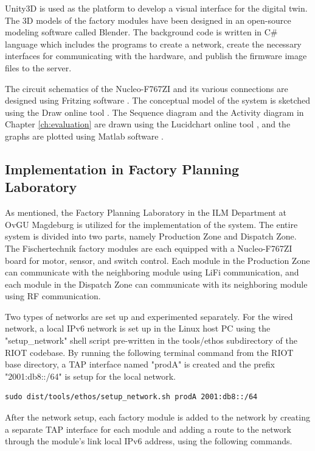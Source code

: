 Unity3D is used as the platform to develop a visual interface for the digital twin. The 3D models of the factory modules have been designed in an open-source modeling software called Blender. The background code is written in C\# language which includes the programs to create a network, create the necessary interfaces for communicating with the hardware, and publish the firmware image files to the server.

The circuit schematics of the Nucleo-F767ZI and its various connections are designed using Fritzing software \cite{Fritzing_2016}. The conceptual model of the system is sketched using the Draw online tool \cite{Benson_2015}. The Sequence diagram and the Activity diagram in Chapter \ref{ch:evaluation} are drawn using the Lucidchart online tool \cite{Dilts_Sun_2010}, and the graphs are plotted using Matlab software \cite{Little_Moler_1984}.

\subsection{Implementation in Factory Planning Laboratory}
As mentioned, the Factory Planning Laboratory in the \acrshort{ILM} Department at OvGU Magdeburg is utilized for the implementation of the system. The entire system is divided into two parts, namely Production Zone and Dispatch Zone. The Fischertechnik factory modules are each equipped with a Nucleo-F767ZI board for motor, sensor, and switch control. Each module in the Production Zone can communicate with the neighboring module using \acrshort{LiFi} communication, and each module in the Dispatch Zone can communicate with its neighboring module using RF communication.

Two types of networks are set up and experimented separately. For the wired network, a local IPv6 network is set up in the Linux host PC using the "setup\_network" shell script pre-written in the tools/ethos subdirectory of the RIOT codebase. 
By running the following terminal command from the RIOT base directory, a TAP interface named "prodA" is created and the prefix "2001:db8::/64" is setup for the local network.

\begin{lstlisting}[caption=Linux Command for Wired Network Setup]
sudo dist/tools/ethos/setup_network.sh prodA 2001:db8::/64
\end{lstlisting}

After the network setup, each factory module is added to the network by creating a separate TAP interface for each module and adding a route to the network through the module's link local IPv6 address, using the following commands.

